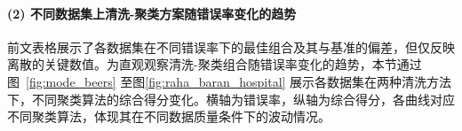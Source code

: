\documentclass[10pt]{article} %
\numberwithin{equation}{section}
\begin{document}
\paragraph{(2) 不同数据集上清洗-聚类方案随错误率变化的趋势}
前文表格展示了各数据集在不同错误率下的最佳组合及其与基准的偏差，但仅反映离散的关键数值。为直观观察清洗-聚类组合随错误率变化的趋势，本节通过图~\ref{fig:mode_beers} 至图\ref{fig:raha_baran_hospital} 展示各数据集在两种清洗方法下，不同聚类算法的综合得分变化。横轴为错误率，纵轴为综合得分，各曲线对应不同聚类算法，体现其在不同数据质量条件下的波动情况。

\begin{figure}[htbp]
  \centering
  \footnotesize %
  \setlength{\abovecaptionskip}{2pt} %
  \setlength{\belowcaptionskip}{2pt} %


\end{figure}
\end{document}
